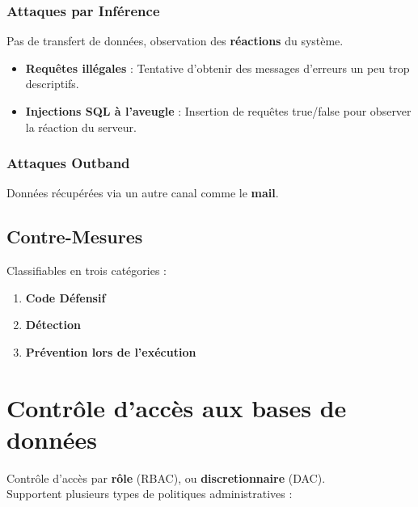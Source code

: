 \documentclass{report}
\begin{document}
			\subsubsection{Attaques par Inférence}

				Pas de transfert de données, observation des \textbf{réactions} du système.\\

				\begin{itemize}
					\item \textbf{Requêtes illégales} : Tentative d'obtenir des messages d'erreurs un peu trop descriptifs.
					\item \textbf{Injections SQL à l'aveugle} : Insertion de requêtes true/false pour observer la réaction du serveur.\\
				\end{itemize}

			\subsubsection{Attaques Outband}

				Données récupérées via un autre canal comme le \textbf{mail}.\\

		\subsection{Contre-Mesures}

			Classifiables en trois catégories : \\

			\begin{enumerate}
				\item \textbf{Code Défensif}
				\item \textbf{Détection}
				\item \textbf{Prévention lors de l'exécution}\\
			\end{enumerate}

	\section{Contrôle d'accès aux bases de données}

		Contrôle d'accès par \textbf{rôle} (RBAC), ou \textbf{discretionnaire} (DAC).\\
		Supportent plusieurs types de politiques administratives : \\
\end{document}
